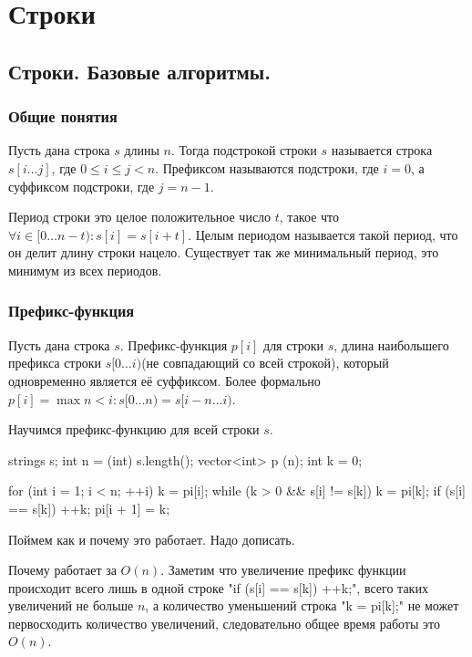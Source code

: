\chapter{Строки}
\section{Строки. Базовые алгоритмы.}

\subsection{Общие понятия}

Пусть дана строка $s$ длины $n$. 
Тогда подстрокой строки $s$ называется строка $s[i \dots j]$, где $0 \le i \le j < n$.
Префиксом называются подстроки, где $i = 0$, а суффиксом подстроки, где $j = n - 1$.

Период строки это целое положительное число $t$, такое что $\forall i \in [0 \dots n-t) \colon s[i] = s[i + t]$.
Целым периодом называется такой период, что он делит длину строки нацело. 
Существует так же минимальный период, это минимум из всех периодов.

\subsection{Префикс-функция}
Пусть дана строка $s$. 
Префикс-функция $p[i]$ для строки $s$, длина наибольшего префикса строки $s[0 \dots i)$(не совпадающий со всей строкой), который одновременно является её суффиксом.
Более формально $p[i] = \max n < i \colon s[0 \dots n) = s[i - n \dots i)$.

Научимся префикс-функцию для всей строки $s$.

\begin{cppcode}
strings s;
int n = (int) s.length();
vector<int> p (n);
int k = 0;

for (int i = 1; i < n; ++i) {
  k = pi[i];
  while (k > 0 && s[i] != s[k])
    k = pi[k];
  if (s[i] == s[k]) ++k;
  pi[i + 1] = k;
}
\end{cppcode}

Поймем как и почему это работает. 
Надо дописать.

Почему работает за $O(n)$.
Заметим что увеличение префикс функции происходит всего лишь в одной строке \cpp"if (s[i] == s[k]) ++k;", всего таких увеличений не больше $n$, а количество уменьшений строка \cpp"k = pi[k];" не может первосходить количество увеличений, следовательно общее время работы это $O(n)$.

